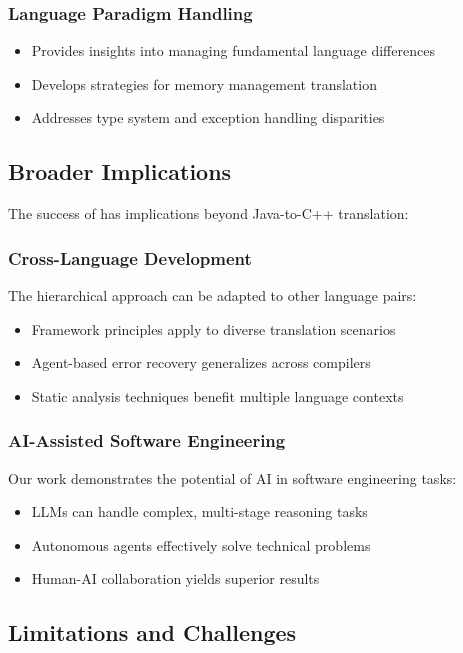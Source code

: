 \subsubsection{Language Paradigm Handling}
\begin{itemize}
\item Provides insights into managing fundamental language differences
\item Develops strategies for memory management translation
\item Addresses type system and exception handling disparities
\end{itemize}

\subsection{Broader Implications}

The success of \tool{} has implications beyond Java-to-C++ translation:

\subsubsection{Cross-Language Development}
The hierarchical approach can be adapted to other language pairs:
\begin{itemize}
\item Framework principles apply to diverse translation scenarios
\item Agent-based error recovery generalizes across compilers
\item Static analysis techniques benefit multiple language contexts
\end{itemize}

\subsubsection{AI-Assisted Software Engineering}
Our work demonstrates the potential of AI in software engineering tasks:
\begin{itemize}
\item LLMs can handle complex, multi-stage reasoning tasks
\item Autonomous agents effectively solve technical problems
\item Human-AI collaboration yields superior results
\end{itemize}

\subsection{Limitations and Challenges}

